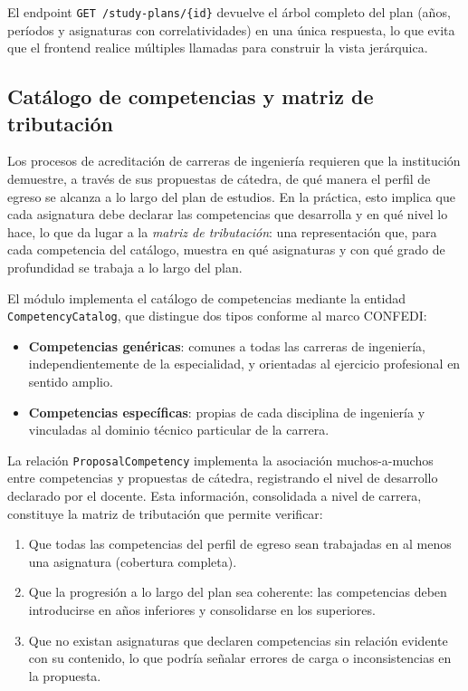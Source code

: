 El endpoint \texttt{GET /study-plans/\{id\}} devuelve el árbol completo
del plan (años, períodos y asignaturas con correlatividades) en una
única respuesta, lo que evita que el frontend realice múltiples llamadas
para construir la vista jerárquica.

\subsection{Catálogo de competencias y matriz de tributación}
\label{subsec:competencias}

Los procesos de acreditación de carreras de ingeniería requieren que la
institución demuestre, a través de sus propuestas de cátedra, de qué manera
el perfil de egreso se alcanza a lo largo del plan de estudios.
En la práctica, esto implica que cada asignatura debe declarar las
competencias que desarrolla y en qué nivel lo hace, lo que da lugar
a la \emph{matriz de tributación}: una representación que, para cada
competencia del catálogo, muestra en qué asignaturas y con qué grado
de profundidad se trabaja
a lo largo del plan.

El módulo implementa el catálogo de competencias mediante la entidad
\texttt{CompetencyCatalog}, que distingue dos tipos conforme al marco
CONFEDI:

\begin{itemize}
  \item \textbf{Competencias genéricas}: comunes a todas las carreras de
  ingeniería, independientemente de la especialidad, y orientadas al
  ejercicio profesional en sentido amplio.
  \item \textbf{Competencias específicas}: propias de cada disciplina
  de ingeniería y vinculadas
  al dominio técnico particular de la carrera.
\end{itemize}

La relación \texttt{ProposalCompetency} implementa la asociación muchos-a-muchos
entre competencias y propuestas de cátedra, registrando el nivel de
desarrollo declarado por el docente.
Esta información, consolidada a nivel de carrera, constituye la
matriz de tributación que permite verificar:

\begin{enumerate}
  \item Que todas las competencias del perfil de egreso sean trabajadas
  en al menos una asignatura (cobertura completa).
  \item Que la progresión a lo largo del plan sea coherente: las
  competencias deben introducirse en años inferiores y consolidarse
  en los superiores.
  \item Que no existan asignaturas que declaren competencias sin relación
  evidente con su contenido, lo que podría señalar errores de carga
  o inconsistencias en la propuesta.
\end{enumerate}

